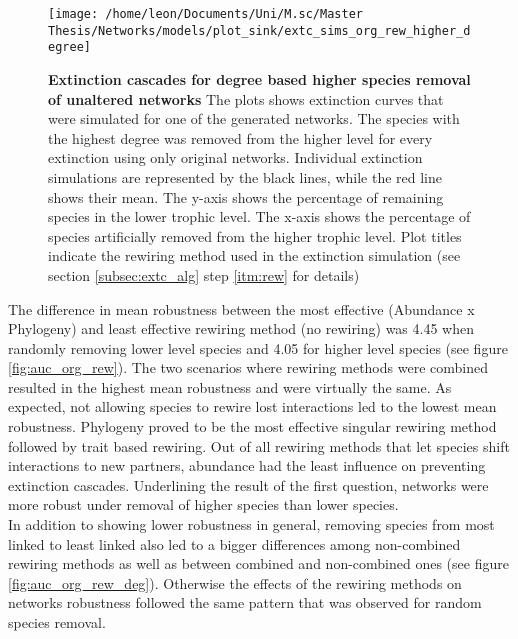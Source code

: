 \documentclass[12pt,a4paper]{article}
\begin{document}
\begin{figure}[H]
	 \centering
	 \texttt{[image: /home/leon/Documents/Uni/M.sc/Master Thesis/Networks/models/plot\_sink/extc\_sims\_org\_rew\_higher\_degree]}
	 \captionsetup{width = \textwidth}
	 \caption[Extinction cascades for degree based higher species removal of unaltered networks]{\textbf{Extinction cascades for degree based higher species removal of unaltered networks} The plots shows extinction curves that were simulated for one of the generated networks. The species with the highest degree was removed from the higher level for every extinction using only original networks. Individual extinction simulations are represented by the black lines, while the red line shows their mean. The y-axis shows the percentage of remaining species in the lower trophic level. The x-axis shows the percentage of species artificially removed from the higher trophic level. Plot titles indicate the rewiring method used in the extinction simulation (see section \ref{subsec:extc_alg} step \ref{itm:rew} for details)}
	 \label{fig:extc_org_rew_higher_deg}
\end{figure}






The difference in mean robustness between the most effective (Abundance x Phylogeny) and least effective rewiring method (no rewiring) was 4.45 when randomly removing lower level species and 4.05 for higher level species (see figure \ref{fig:auc_org_rew}). The two scenarios where rewiring methods were combined resulted in the highest mean robustness and were virtually the same. As expected, not allowing species to rewire lost interactions led to the lowest mean robustness. Phylogeny proved to be the most effective singular rewiring method followed by trait based rewiring. Out of all rewiring methods that let species shift interactions to new partners, abundance had the least influence on preventing extinction cascades. 
Underlining the result of the first question, networks were more robust under removal of higher species than lower species. \\

In addition to showing lower robustness in general, removing species from most linked to least linked also led to a bigger differences among non-combined rewiring methods as well as between combined and non-combined ones (see figure \ref{fig:auc_org_rew_deg}). Otherwise the effects of the rewiring methods on networks robustness followed the same pattern that was observed for random species removal.\par
\end{document}
